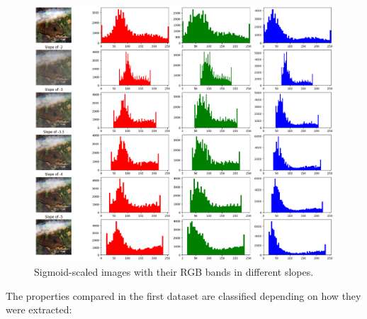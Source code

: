 \begin{figure}[H]
	\centering
	\includegraphics[width=16cm]{imgs/eda/sigmoid-slope}
	\caption{Sigmoid-scaled images with their RGB bands in different slopes.}
	\label{fig:eda-sigmoid-slope}
\end{figure}
The properties compared in the first dataset are classified depending on how they were extracted:

